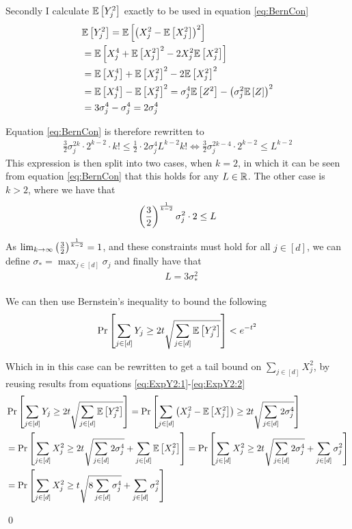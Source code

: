 \documentclass[a4paper,12pt]{article}
\renewenvironment{proof}{{\textit{Proof} \\}}{\qed}
\begin{document}
\begin{proof}
\noindent Secondly I calculate $\mathbb{E} \left [ Y_j^2  \right]$ exactly to be used in equation \ref{eq:BernCon}
\begin{align}
\label{eq:ExpY2:1}
    &\mathbb{E} \left [ Y_j^2  \right] = 
    \mathbb{E} \left [ \left (X_j^2 - \mathbb{E} \left [ X_j^2  \right]\right)^2  \right] \\
    &=\mathbb{E} \left [ X_j^4 + \mathbb{E} \left [ X_j^2  \right]^2 - 2X_j^2\mathbb{E} \left [ X_j^2  \right]  \right] \\
    &=\mathbb{E} \left [ X_j^4  \right] + \mathbb{E} \left [ X_j^2  \right]^2 - 2\mathbb{E} \left [ X_j^2  \right]^2 \\
    &=\mathbb{E} \left [ X_j^4  \right]  - \mathbb{E} \left [ X_j^2  \right]^2 =
    \sigma_j^4\mathbb{E} \left [ Z^2  \right]  - \left (\sigma_j^2\mathbb{E} \left [ Z  \right]\right)^2 \\
\label{eq:ExpY2:2}
    &=3\sigma_j^4  - \sigma_j^4 =
    2\sigma_j^4
\end{align}

Equation \eqref{eq:BernCon} is therefore rewritten to 
\begin{align*}
    \frac{3}{2}\sigma_j^{2k} \cdot 2^{k-2} \cdot k! \le \frac{1}{2} \cdot 2 \sigma_j^4 L^{k-2} k! 
    \iff \frac{3}{2} \sigma_j^{2k-4} \cdot 2^{k-2} \le L^{k-2}
\end{align*}
This expression is then split into two cases, when $k=2$, in which it can be seen from equation \eqref{eq:BernCon} that this holds for any $L \in \mathbb{R}$.
The other case is $k>2$, where we have that 
\[
    \left (\frac{3}{2}\right)^{\frac{1}{k-2}} \sigma_j^2 \cdot 2 \le L
\]

As $\lim_{k \rightarrow \infty} \left (\frac{3}{2}\right)^{\frac{1}{k-2}} = 1$, 
and these constraints must hold for all $j \in [d]$, we can define $\sigma_* = \max_{j \in [d]} \sigma_j$ and finally have that
\begin{align*}
    &L = 3\sigma_*^2 
\end{align*}

We can then use Bernstein's inequality to bound the following 
\begin{equation}
\label{eq:BernIneq}
    \Pr\left [\sum_{j \in [d]} Y_j \ge 2 t \sqrt{ \sum_{j \in [d]} \mathbb{E} \left [ Y_j^2  \right]} \right] < e^{-t^2}
\end{equation}

Which in in this case can be rewritten to get a tail bound on $\sum_{j \in [d]} X_j^2$,
by reusing results from equations \eqref{eq:ExpY2:1}-\eqref{eq:ExpY2:2}
\begin{align*}
&\Pr\left [\sum_{j \in [d]} Y_j \ge 2 t \sqrt{ \sum_{j \in [d]} \mathbb{E} \left [ Y_j^2  \right]} \right] 
=\Pr\left [\sum_{j \in [d]} \left (X_j^2 - \mathbb{E} \left [ X_j^2  \right]\right) \ge 2 t \sqrt{ \sum_{j \in [d]} 2 \sigma_j^4} \right] \\
&=\Pr\left [\sum_{j \in [d]} X_j^2  \ge 2 t \sqrt{ \sum_{j \in [d]} 2 \sigma_j^4} + \sum_{j \in [d]} \mathbb{E} \left [ X_j^2  \right] \right] 
=\Pr\left [\sum_{j \in [d]} X_j^2  \ge 2 t \sqrt{ \sum_{j \in [d]} 2 \sigma_j^4} + \sum_{j \in [d]} \sigma_j^2 \right]  \\
&=\Pr\left [\sum_{j \in [d]} X_j^2  \ge 
    t \sqrt{ 8 \sum_{j \in [d]}  \sigma_j^4} +
    \sum_{j \in [d]} \sigma_j^2  \right] \\
\end{align*}


\end{proof}
\end{document}
